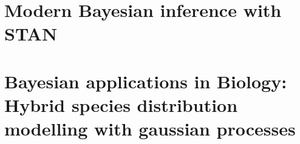 \documentclass[
  12pt,
]{book}
\theoremstyle{definition}
\theoremstyle{definition}
\theoremstyle{definition}
\theoremstyle{remark}
\begin{document}
\hypertarget{modern-bayesian-inference-with-stan}{%
\chapter{Modern Bayesian inference with STAN}\label{modern-bayesian-inference-with-stan}}

\hypertarget{bayesian-applications-in-biology-hybrid-species-distribution-modelling-with-gaussian-processes}{%
\chapter{Bayesian applications in Biology: Hybrid species distribution modelling with gaussian processes}\label{bayesian-applications-in-biology-hybrid-species-distribution-modelling-with-gaussian-processes}}

  
\end{document}
